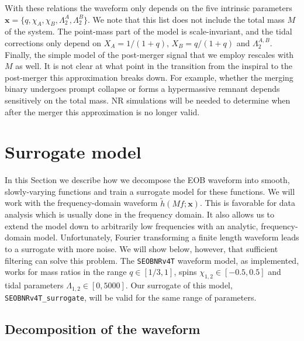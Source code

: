\documentclass[prd,aps,letter,twocolumn,floatfix,notitlepage,nofootinbib]{revtex4-1}
\def\bx{\mathbf{x}}
\begin{document}
With these relations the waveform only depends on the five intrinsic parameters $\bx=\{q, \chi_A, \chi_B, \Lambda_2^A,\Lambda_2^B\}$. 
We note that this list does not include the total mass $M$ of the system. The point-mass part of the model is scale-invariant, and the tidal corrections only depend on $X_A=1/(1+q)$, $X_B=q/(1+q)$ and $\Lambda_2^{A,B}$. Finally, the simple model of the post-merger signal that we employ rescales with $M$ as well. It is not clear at what point in the transition from the inspiral to the post-merger this approximation breaks down. For example, whether the merging binary undergoes prompt collapse or forms a hypermassive remnant depends sensitively on the total mass. NR simulations will be needed to determine when after the merger this approximation is no longer valid.

\section{Surrogate model}

In this Section we describe how we decompose the EOB waveform into smooth, slowly-varying functions and train a surrogate model for these functions. We will work with the frequency-domain waveform $\tilde h(Mf; \bx)$. This is favorable for data analysis which is usually done in the frequency domain. It also allows us to extend the model down to arbitrarily low frequencies with an analytic, frequency-domain model. Unfortunately, Fourier transforming a finite length waveform leads to a surrogate with more noise. We will show below, however, that sufficient filtering can solve this problem. The \texttt{SEOBNRv4T} waveform model, as implemented, works for mass ratios in the range $q \in [1/3, 1]$, spins $\chi_{1,2} \in [-0.5, 0.5]$ and tidal parameters $\Lambda_{1,2} \in [0, 5000]$. Our surrogate of this model, \texttt{SEOBNRv4T\_surrogate}, will be valid for the same range of parameters.


\subsection{Decomposition of the waveform}
\end{document}
